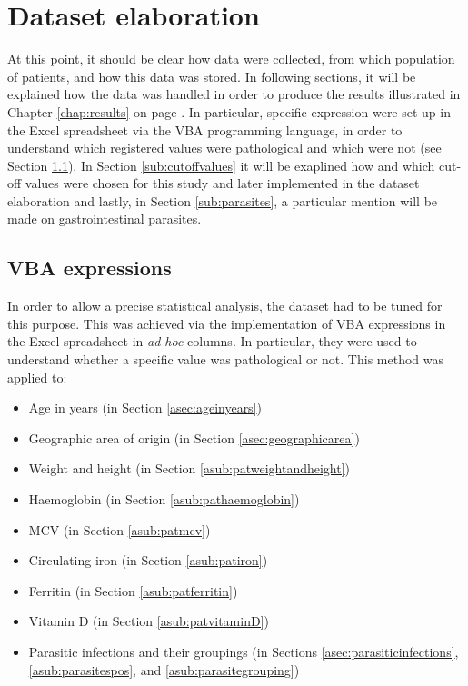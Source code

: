 \section{Dataset elaboration}\label{sec:datasetelaboration}
At this point, it should be clear how data were collected, from which population of patients, and how this data was stored. In following sections, it will be explained how the data was handled in order to produce the results illustrated in Chapter \ref{chap:results} on page \pageref{chap:results}. In particular, specific expression were set up in the Excel spreadsheet via the VBA programming language, in order to understand which registered values were pathological and which were not (see Section \ref{sub:vbaexpressions}). In Section \ref{sub:cutoffvalues} it will be exaplined how and which cut-off values were chosen for this study and later implemented in the dataset elaboration and lastly, in Section \ref{sub:parasites}, a particular mention will be made on gastrointestinal parasites.

\subsection{VBA expressions}\label{sub:vbaexpressions}
In order to allow a precise statistical analysis, the dataset had to be tuned for this purpose. This was achieved via the implementation of VBA expressions in the Excel spreadsheet in \textit{ad hoc} columns. In particular, they were used to understand whether a specific value was pathological or not. This method was applied to:

\begin{itemize}
	\item Age in years (in Section \ref{asec:ageinyears})
	\item Geographic area of origin (in Section \ref{asec:geographicarea})
	\item Weight and height (in Section \ref{asub:patweightandheight})
	\item Haemoglobin (in Section \ref{asub:pathaemoglobin})
	\item MCV (in Section \ref{asub:patmcv})
	\item Circulating iron (in Section \ref{asub:patiron})
	\item Ferritin (in Section \ref{asub:patferritin})
	\item Vitamin D (in Section \ref{asub:patvitaminD})
	\item Parasitic infections and their groupings (in Sections \ref{asec:parasiticinfections}, \ref{asub:parasitespos}, and \ref{asub:parasitegrouping})
\end{itemize}

